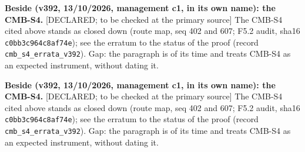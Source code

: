 \documentclass[11pt]{article}
\theoremstyle{definition}\newtheorem{deriv}{Derivation}
\begin{document}
\textbf{Beside (v392, 13/10/2026, management c1, in its own name): the CMB-S4.} \textsf{[DECLARED; to be checked at the primary source]} The CMB-S4 cited above stands as closed down (route map, seq 402 and 607; F5.2 audit, sha16 \texttt{c0bb3c964c8af74e}); see the erratum to the status of the proof (record \texttt{cmb\_s4\_errata\_v392}). Gap: the paragraph is of its time and treats CMB-S4 as an expected instrument, without dating it.

\textbf{Beside (v392, 13/10/2026, management c1, in its own name): the CMB-S4.} \textsf{[DECLARED; to be checked at the primary source]} The CMB-S4 cited above stands as closed down (route map, seq 402 and 607; F5.2 audit, sha16 \texttt{c0bb3c964c8af74e}); see the erratum to the status of the proof (record \texttt{cmb\_s4\_errata\_v392}). Gap: the paragraph is of its time and treats CMB-S4 as an expected instrument, without dating it.
\end{document}
